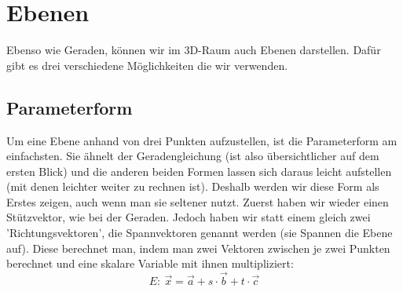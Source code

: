\section{Ebenen}
	Ebenso wie Geraden, können wir im 3D-Raum auch Ebenen darstellen. Dafür gibt es
	drei verschiedene Möglichkeiten die wir verwenden.

	\subsection{Parameterform}
		Um eine Ebene anhand von drei Punkten aufzustellen, ist die Parameterform am
		einfachsten. Sie ähnelt der Geradengleichung (ist also übersichtlicher auf dem
		ersten Blick) und die anderen beiden Formen lassen sich daraus leicht
		aufstellen (mit denen leichter weiter zu rechnen ist). Deshalb werden wir
		diese Form als Erstes zeigen, auch wenn man sie seltener nutzt. Zuerst haben
		wir wieder einen Stützvektor, wie bei der Geraden. Jedoch haben wir statt
		einem gleich zwei 'Richtungsvektoren', die Spannvektoren genannt werden (sie
		Spannen die Ebene auf). Diese berechnet man, indem man zwei Vektoren zwischen
		je zwei Punkten berechnet und eine skalare Variable mit ihnen multipliziert:
		\[E:\ \vec{x}=\vec{a}+s\cdot \vec{b}+t\cdot \vec{c}\]

